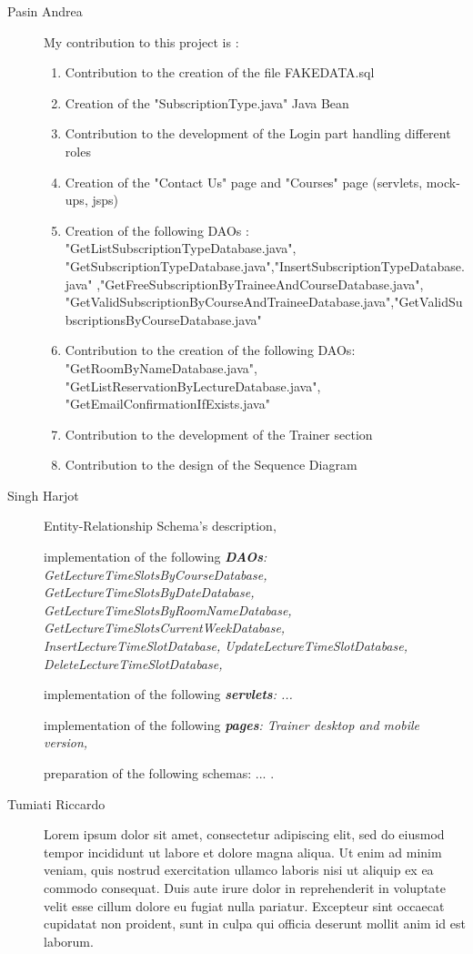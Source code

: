 \begin{description}
	\item[Pasin Andrea] My contribution to this project is :
	\begin{enumerate}
		\item Contribution to the creation of the file FAKE\textunderscore DATA.sql 
		\item Creation of the "SubscriptionType.java" Java Bean
		\item Contribution to the development of the Login part handling different roles
		\item Creation of the "Contact Us" page and "Courses" page (servlets, mock-ups, jsps)
		\item Creation of the following DAOs : "GetListSubscriptionTypeDatabase.java", "GetSubscriptionTypeDatabase.java","InsertSubscriptionTypeDatabase.java" ,"GetFreeSubscriptionByTraineeAndCourseDatabase.java", "GetValidSubscriptionByCourseAndTraineeDatabase.java","GetValidSubscriptionsByCourseDatabase.java"
		\item Contribution to the creation of the following DAOs: "GetRoomByNameDatabase.java", "GetListReservationByLectureDatabase.java", "GetEmailConfirmationIfExists.java"
		\item Contribution to the development of the Trainer section
		\item Contribution to the design of the Sequence Diagram
	\end{enumerate}
	\item[Singh Harjot] Entity-Relationship Schema's description,
	
	implementation of the following \textit{\textbf{DAOs}:
		GetLectureTimeSlotsByCourseDatabase,
		GetLectureTimeSlotsByDateDatabase,
		GetLectureTimeSlotsByRoomNameDatabase,
		GetLectureTimeSlotsCurrentWeekDatabase,
		InsertLectureTimeSlotDatabase,
		UpdateLectureTimeSlotDatabase,
		DeleteLectureTimeSlotDatabase,
	}
	
	implementation of the following \textit{\textbf{servlets}: 
		... 
	}
	
	implementation of the following \textit{\textbf{pages}: 
		Trainer desktop and mobile version,
	}
	
	preparation of the following schemas: ... .
	\item[Tumiati Riccardo] Lorem ipsum dolor sit amet, consectetur adipiscing elit, sed do eiusmod tempor incididunt ut labore et dolore magna aliqua. Ut enim ad minim veniam, quis nostrud exercitation ullamco laboris nisi ut aliquip ex ea commodo consequat. Duis aute irure dolor in reprehenderit in voluptate velit esse cillum dolore eu fugiat nulla pariatur. Excepteur sint occaecat cupidatat non proident, sunt in culpa qui officia deserunt mollit anim id est laborum.
\end{description}